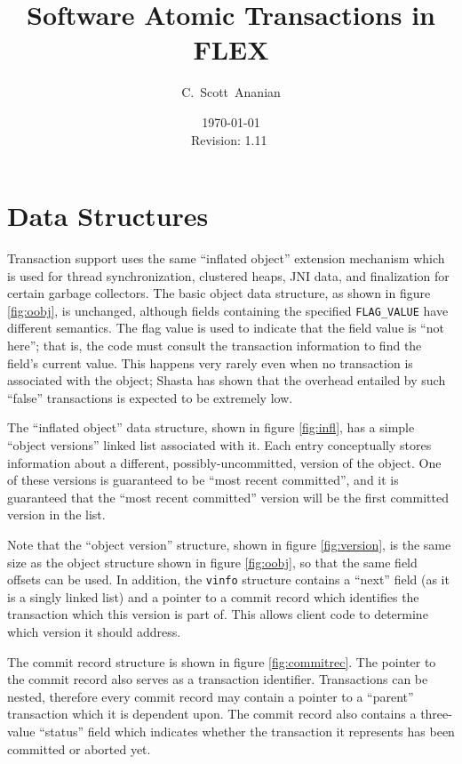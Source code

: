 \documentclass[11pt,notitlepage]{article}
\author{C.~Scott~Ananian}
\title{Software Atomic Transactions in FLEX}
\date{\today \\ $ $Revision: 1.11 $ $}
\begin{document}

\maketitle
\section{Data Structures}

Transaction support uses the same ``inflated object'' extension
mechanism which is used for thread synchronization, clustered heaps,
JNI data, and finalization for certain garbage collectors.
The basic object data structure, as shown in figure \ref{fig:oobj}, is
unchanged, although fields containing the specified
\texttt{FLAG\_VALUE} have different semantics.  The flag value is used
to indicate that the field value is ``not here''; that is, the code
must consult the transaction information to find the field's current
value.  This happens very rarely even when no transaction is
associated with the object; Shasta \cite{scales96:shasta} has shown that the
overhead entailed by such ``false'' transactions is expected to be
extremely low.

The ``inflated object'' data structure, shown in figure
\ref{fig:infl}, has a simple ``object versions'' linked list associated with
it.  Each entry conceptually stores information about a different,
possibly-uncommitted, version of the object.  One of these versions is
guaranteed to be ``most recent committed'', and it is guaranteed that
the ``most recent committed'' version will be the first committed
version in the list.

Note that the ``object version'' structure, shown in figure
\ref{fig:version}, is the same size as the object structure shown in
figure \ref{fig:oobj}, so that the same field offsets can be used.
In addition, the \texttt{vinfo} structure contains a ``next'' field
(as it is a singly linked list) and a pointer to a commit record which
identifies the transaction which this version is part of.  This allows
client code to determine which version it should address.

The commit record structure is shown in figure \ref{fig:commitrec}.
The pointer to the commit record also serves as a transaction
identifier.  Transactions can be nested, therefore every commit record
may contain a pointer to a ``parent'' transaction which it is
dependent upon.  The commit record also contains a three-value
``status'' field which indicates whether the transaction it represents
has been committed or aborted yet.
\end{document}
